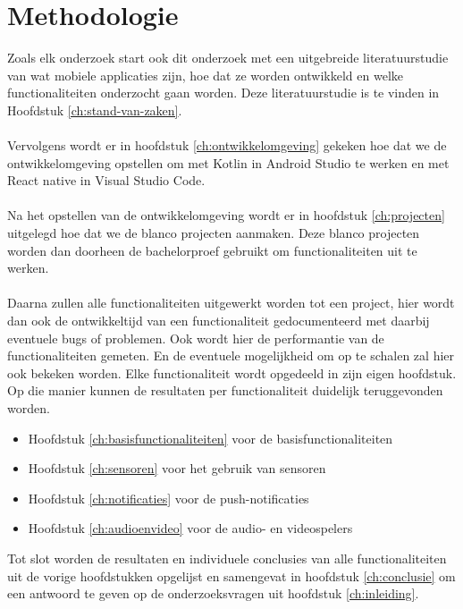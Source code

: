 
\chapter{Methodologie}
\label{ch:methodologie}


Zoals elk onderzoek start ook dit onderzoek met een uitgebreide literatuurstudie van wat mobiele applicaties zijn, 
hoe dat ze worden ontwikkeld en welke functionaliteiten onderzocht gaan worden. Deze literatuurstudie is te vinden in Hoofdstuk \ref{ch:stand-van-zaken}.
\\\\
Vervolgens wordt er in hoofdstuk \ref{ch:ontwikkelomgeving} gekeken hoe dat we de ontwikkelomgeving opstellen om met Kotlin in Android Studio 
te werken en met React native in Visual Studio Code.
\\\\
Na het opstellen van de ontwikkelomgeving wordt er in hoofdstuk \ref{ch:projecten} uitgelegd hoe dat we de blanco projecten aanmaken. 
Deze blanco projecten worden dan doorheen de bachelorproef gebruikt om functionaliteiten uit te werken.
\\\\
Daarna zullen alle functionaliteiten uitgewerkt worden tot een project, hier wordt dan ook de ontwikkeltijd van een functionaliteit 
gedocumenteerd met daarbij eventuele bugs of problemen. Ook wordt hier de performantie van de functionaliteiten gemeten. 
En de eventuele mogelijkheid om op te schalen zal hier ook bekeken worden. Elke functionaliteit wordt opgedeeld in zijn eigen hoofdstuk. 
Op die manier kunnen de resultaten per functionaliteit duidelijk teruggevonden worden.
\begin{itemize}
    \item Hoofdstuk \ref{ch:basisfunctionaliteiten} voor de basisfunctionaliteiten
    \item Hoofdstuk \ref{ch:sensoren} voor het gebruik van sensoren
    \item Hoofdstuk \ref{ch:notificaties} voor de push-notificaties
    \item Hoofdstuk \ref{ch:audioenvideo} voor de audio- en videospelers
\end{itemize}
Tot slot worden de resultaten en individuele conclusies van alle functionaliteiten uit de vorige hoofdstukken opgelijst en samengevat 
in hoofdstuk \ref{ch:conclusie} om een antwoord te geven op de onderzoeksvragen uit hoofdstuk \ref{ch:inleiding}.

